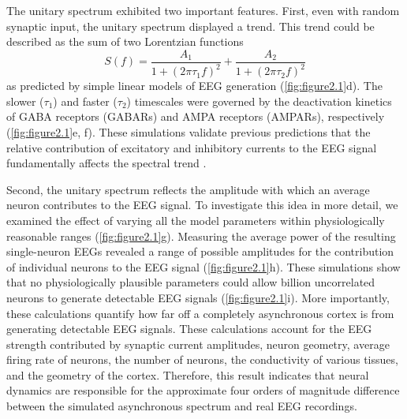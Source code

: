 The unitary spectrum exhibited two important features. First, even with random synaptic input, the unitary spectrum displayed a trend. This trend could be described as the sum of two Lorentzian functions
\begin{equation} \label{eq:linear_model}
    S(f) = \frac{A_1}{1+(2\pi \tau_1 f)^2} + \frac{A_2}{1+(2\pi \tau_2 f)^2}
\end{equation}
as predicted by simple linear models of EEG generation \cite{Gao2017,Miller2009} (\autoref{fig:figure2.1}d). The slower ($\tau_1$) and faster ($\tau_2$) timescales were governed by the deactivation kinetics of GABA receptors (GABARs) and AMPA receptors (AMPARs), respectively (\autoref{fig:figure2.1}e, f). These simulations validate previous predictions that the relative contribution of excitatory and inhibitory currents to the EEG signal fundamentally affects the spectral trend \cite{Gao2017}.

Second, the unitary spectrum reflects the amplitude with which an average neuron contributes to the EEG signal. To investigate this idea in more detail, we examined the effect of varying all the model parameters within physiologically reasonable ranges (\autoref{fig:figure2.1}g). Measuring the average power of the resulting single-neuron EEGs revealed a range of possible amplitudes for the contribution of individual neurons to the EEG signal (\autoref{fig:figure2.1}h). These simulations show that no physiologically plausible parameters could allow  \cite{Gao2017} billion uncorrelated neurons to generate detectable EEG signals (\autoref{fig:figure2.1}i). More importantly, these calculations quantify how far off a completely asynchronous cortex is from generating detectable EEG signals. These calculations account for the EEG strength contributed by synaptic current amplitudes, neuron geometry, average firing rate of neurons, the number of neurons, the conductivity of various tissues, and the geometry of the cortex. Therefore, this result indicates that neural dynamics are responsible for the approximate four orders of magnitude difference between the simulated asynchronous spectrum and real EEG recordings.

